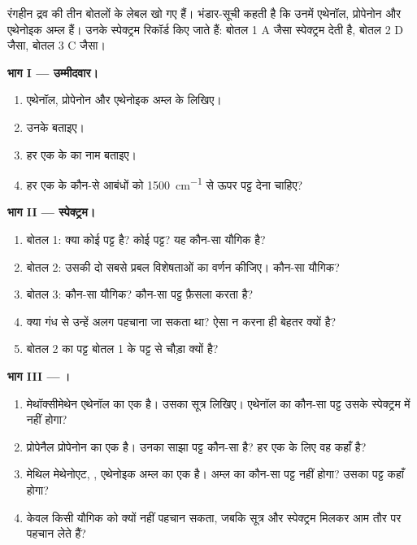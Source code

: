 \begin{problem}
\label{pb:g11:infrared:1}
रंगहीन द्रव की तीन बोतलों के लेबल खो गए हैं। भंडार-सूची
कहती है कि उनमें एथेनॉल, प्रोपेनोन और एथेनोइक अम्ल हैं। उनके स्पेक्ट्रम
रिकॉर्ड किए जाते हैं: बोतल 1 A जैसा स्पेक्ट्रम देती है, बोतल 2 D जैसा, बोतल 3
C जैसा।

\medskip
\noindent\textbf{भाग I --- उम्मीदवार।}
\begin{enumerate}
  \item एथेनॉल, प्रोपेनोन और एथेनोइक अम्ल के  लिखिए।
  \item उनके  बताइए।
  \item हर एक के  का नाम बताइए।
  \item हर एक के कौन-से आबंधों को \qty{1500}{cm^{-1}} से ऊपर
        पट्ट देना चाहिए?
\end{enumerate}

\medskip
\noindent\textbf{भाग II --- स्पेक्ट्रम।}
\begin{enumerate}[resume]
  \item बोतल 1: क्या कोई  पट्ट है? कोई  पट्ट? यह कौन-सा
        यौगिक है?
  \item बोतल 2: उसकी दो सबसे प्रबल विशेषताओं का वर्णन कीजिए। कौन-सा यौगिक?
  \item बोतल 3: कौन-सा यौगिक? कौन-सा पट्ट फ़ैसला करता है?
  \item क्या गंध से उन्हें अलग पहचाना जा सकता था? ऐसा न करना ही बेहतर क्यों
        है?
  \item बोतल 2 का  पट्ट बोतल 1 के पट्ट से चौड़ा क्यों है?
\end{enumerate}

\medskip
\noindent\textbf{भाग III --- ।}
\begin{enumerate}[resume]
  \item मेथॉक्सीमेथेन एथेनॉल का एक  है। उसका सूत्र लिखिए। एथेनॉल का कौन-सा
        पट्ट उसके स्पेक्ट्रम में नहीं होगा?
  \item प्रोपेनैल प्रोपेनोन का एक  है। उनका साझा पट्ट कौन-सा है?
        हर एक के लिए वह कहाँ है?
  \item मेथिल मेथेनोएट, , एथेनोइक अम्ल का एक  है।
        अम्ल का कौन-सा पट्ट नहीं होगा? उसका
         पट्ट कहाँ होगा?
  \item केवल  किसी यौगिक को क्यों नहीं पहचान सकता, जबकि
        सूत्र और स्पेक्ट्रम मिलकर आम तौर पर पहचान लेते हैं?
\end{enumerate}


\end{problem}
